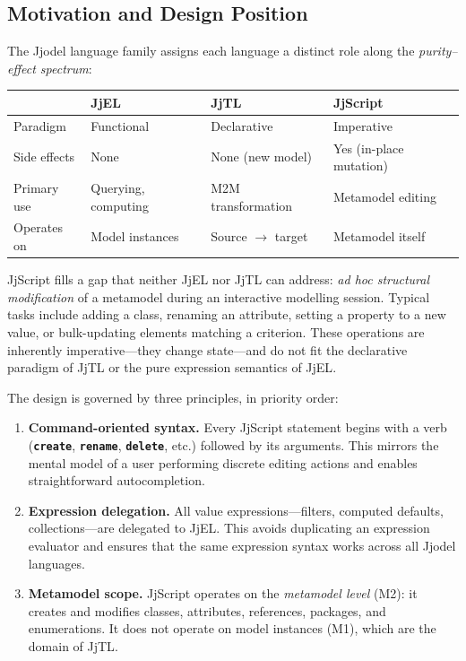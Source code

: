 \documentclass[11pt,a4paper]{article}
\newcommand{\jjscript}{\textsf{JjScript}}
\newcommand{\jjel}{\textsf{JjEL}}
\newcommand{\jjtl}{\textsf{JjTL}}
\newcommand{\kw}[1]{\texttt{\textbf{#1}}}
\begin{document}
\subsection{Motivation and Design Position}\label{sec:jjscript-motivation}

The Jjodel language family assigns each language a distinct role along the
\emph{purity--effect spectrum}:

\begin{center}
\begin{tabular}{@{}llll@{}}
\toprule
& \textbf{\jjel{}} & \textbf{\jjtl{}} & \textbf{\jjscript{}} \\
\midrule
Paradigm & Functional & Declarative & Imperative \\
Side effects & None & None (new model) & Yes (in-place mutation) \\
Primary use & Querying, computing & M2M transformation & Metamodel editing \\
Operates on & Model instances & Source $\to$ target & Metamodel itself \\
\bottomrule
\end{tabular}
\end{center}

\jjscript{} fills a gap that neither \jjel{} nor \jjtl{} can address:
\emph{ad hoc structural modification} of a metamodel during an interactive
modelling session. Typical tasks include adding a class, renaming an
attribute, setting a property to a new value, or bulk-updating elements
matching a criterion. These operations are inherently imperative---they
change state---and do not fit the declarative paradigm of \jjtl{} or the
pure expression semantics of \jjel{}.

The design is governed by three principles, in priority order:

\begin{enumerate}
    \item \textbf{Command-oriented syntax.} Every \jjscript{} statement
          begins with a verb (\kw{create}, \kw{rename}, \kw{delete}, etc.)
          followed by its arguments. This mirrors the mental model of a
          user performing discrete editing actions and enables
          straightforward autocompletion.
    \item \textbf{Expression delegation.} All value expressions---filters,
          computed defaults, collections---are delegated to \jjel{}. This
          avoids duplicating an expression evaluator and ensures that the
          same expression syntax works across all Jjodel languages.
    \item \textbf{Metamodel scope.} \jjscript{} operates on the
          \emph{metamodel level} (M2): it creates and modifies classes,
          attributes, references, packages, and enumerations. It does not
          operate on model instances (M1), which are the domain of \jjtl{}.
\end{enumerate}
\end{document}
